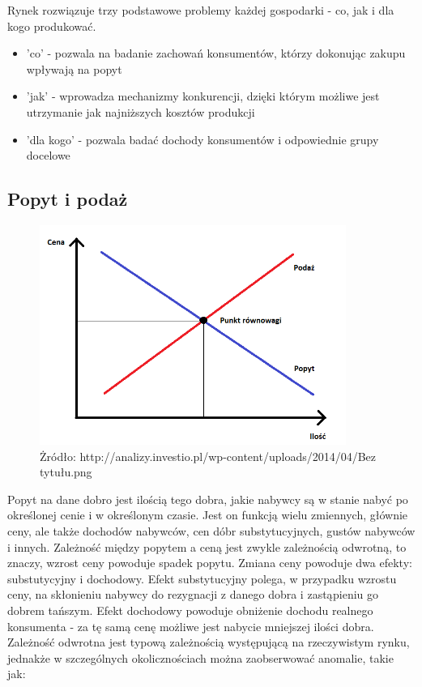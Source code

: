\documentclass[12pt]{extarticle}
\begin{document}
Rynek rozwiązuje trzy podstawowe problemy każdej gospodarki - co, jak i dla kogo produkować.

\begin{itemize}
	\item  'co' - pozwala na badanie zachowań konsumentów, którzy dokonując zakupu wpływają na popyt
	\item 'jak' - wprowadza mechanizmy konkurencji, dzięki którym możliwe jest utrzymanie jak najniższych kosztów produkcji
    \item 'dla kogo' - pozwala badać dochody konsumentów i odpowiednie grupy docelowe
\end{itemize}

\subsection{Popyt i podaż}


\begin{figure}[H]
\centering
\includegraphics[width=10cm]{popyt_podaz}
    \caption{Żródło: http://analizy.investio.pl/wp-content/uploads/2014/04/Bez tytułu.png}
\end{figure}



Popyt na dane dobro jest ilością tego dobra, jakie nabywcy są w stanie nabyć po określonej cenie i w określonym czasie. Jest on funkcją wielu zmiennych, głównie ceny, ale także dochodów nabywców, cen dóbr substytucyjnych, gustów nabywców i innych. Zależność między popytem a ceną jest zwykle zależnością odwrotną, to znaczy, wzrost ceny powoduje spadek popytu. Zmiana ceny powoduje dwa efekty: substutycyjny i dochodowy. Efekt substytucyjny polega, w przypadku wzrostu ceny, na skłonieniu nabywcy do rezygnacji z danego dobra i zastąpieniu go dobrem tańszym. Efekt dochodowy powoduje obniżenie dochodu realnego konsumenta - za tę samą cenę możliwe jest nabycie mniejszej ilości dobra. Zależność odwrotna jest typową zależnością występującą na rzeczywistym rynku, jednakże w szczególnych okolicznościach można zaobserwować anomalie, takie jak:
\end{document}

